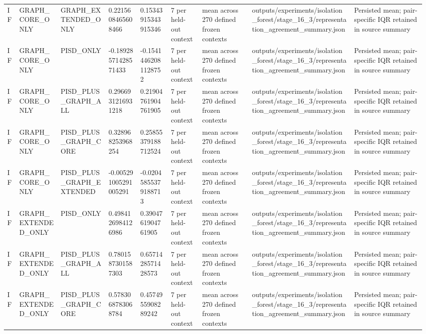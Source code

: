 \begin{longtable}{lllllllll}
IF & GRAPH\_CORE\_ONLY & GRAPH\_EXTENDED\_ONLY & 0.2215608465608466 & 0.15343915343915346 & 7 per held-out context & mean across 270 defined frozen contexts & outputs/experiments/isolation\_forest/stage\_16\_3/representation\_agreement\_summary.json & Persisted mean; pair-specific IQR retained in source summary \\
IF & GRAPH\_CORE\_ONLY & PISD\_ONLY & -0.18928571428571433 & -0.15414462081128752 & 7 per held-out context & mean across 270 defined frozen contexts & outputs/experiments/isolation\_forest/stage\_16\_3/representation\_agreement\_summary.json & Persisted mean; pair-specific IQR retained in source summary \\
IF & GRAPH\_CORE\_ONLY & PISD\_PLUS\_GRAPH\_ALL & 0.2966931216931218 & 0.21904761904761905 & 7 per held-out context & mean across 270 defined frozen contexts & outputs/experiments/isolation\_forest/stage\_16\_3/representation\_agreement\_summary.json & Persisted mean; pair-specific IQR retained in source summary \\
IF & GRAPH\_CORE\_ONLY & PISD\_PLUS\_GRAPH\_CORE & 0.328968253968254 & 0.25855379188712524 & 7 per held-out context & mean across 270 defined frozen contexts & outputs/experiments/isolation\_forest/stage\_16\_3/representation\_agreement\_summary.json & Persisted mean; pair-specific IQR retained in source summary \\
IF & GRAPH\_CORE\_ONLY & PISD\_PLUS\_GRAPH\_EXTENDED & -0.005291005291005291 & -0.02045855379188713 & 7 per held-out context & mean across 270 defined frozen contexts & outputs/experiments/isolation\_forest/stage\_16\_3/representation\_agreement\_summary.json & Persisted mean; pair-specific IQR retained in source summary \\
IF & GRAPH\_EXTENDED\_ONLY & PISD\_ONLY & 0.4984126984126986 & 0.3904761904761905 & 7 per held-out context & mean across 270 defined frozen contexts & outputs/experiments/isolation\_forest/stage\_16\_3/representation\_agreement\_summary.json & Persisted mean; pair-specific IQR retained in source summary \\
IF & GRAPH\_EXTENDED\_ONLY & PISD\_PLUS\_GRAPH\_ALL & 0.7801587301587303 & 0.6571428571428573 & 7 per held-out context & mean across 270 defined frozen contexts & outputs/experiments/isolation\_forest/stage\_16\_3/representation\_agreement\_summary.json & Persisted mean; pair-specific IQR retained in source summary \\
IF & GRAPH\_EXTENDED\_ONLY & PISD\_PLUS\_GRAPH\_CORE & 0.5783068783068784 & 0.4574955908289242 & 7 per held-out context & mean across 270 defined frozen contexts & outputs/experiments/isolation\_forest/stage\_16\_3/representation\_agreement\_summary.json & Persisted mean; pair-specific IQR retained in source summary \\

\end{longtable}
